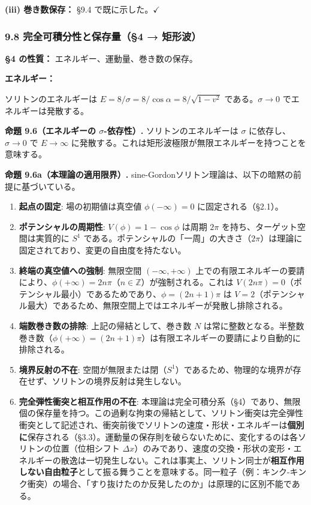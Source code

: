 \documentclass[a4paper,11pt]{ltjsarticle}
\providecommand{\tightlist}{\setlength{\itemsep}{0pt}\setlength{\parskip}{0pt}}
\begin{document}
\textbf{(iii) 巻き数保存：} §9.4 で既に示した。\(\checkmark\)

\subsubsection{9.8 完全可積分性と保存量（§4 →
矩形波）}\label{ux5b8cux5168ux53efux7a4dux5206ux6027ux3068ux4fddux5b58ux91cf4-ux77e9ux5f62ux6ce2}

\textbf{§4 の性質：} エネルギー、運動量、巻き数の保存。

\textbf{エネルギー：}

ソリトンのエネルギーは \(E = 8/\sigma = 8/\cos\alpha = 8/\sqrt{1-v^2}\)
である。\(\sigma \to 0\) でエネルギーは発散する。

\textbf{命題 9.6（エネルギーの \(\sigma\)-依存性）.}
ソリトンのエネルギーは \(\sigma\) に依存し、\(\sigma \to 0\) で
\(E \to \infty\)
に発散する。これは矩形波極限が無限エネルギーを持つことを意味する。

\textbf{命題 9.6a（本理論の適用限界）.}
sine-Gordonソリトン理論は、以下の暗黙の前提に基づいている。

\begin{enumerate}
\def\labelenumi{\arabic{enumi}.}
\tightlist
\item
  \textbf{起点の固定}: 場の初期値は真空値 \(\phi(-\infty) = 0\)
  に固定される（§2.1）。
\item
  \textbf{ポテンシャルの周期性}: \(V(\phi) = 1-\cos\phi\) は周期
  \(2\pi\) を持ち、ターゲット空間は実質的に \(S^1\)
  である。ポテンシャルの「一周」の大きさ（\(2\pi\)）は理論に固定されており、変更の自由度を持たない。
\item
  \textbf{終端の真空値への強制}: 無限空間 \((-\infty, +\infty)\)
  上での有限エネルギーの要請により、\(\phi(+\infty) = 2n\pi\)（\(n \in \mathbb{Z}\)）が強制される。これは
  \(V(2n\pi) = 0\)（ポテンシャル最小）であるためであり、\(\phi = (2n+1)\pi\)
  は
  \(V = 2\)（ポテンシャル最大）であるため、無限空間上ではエネルギーが発散し排除される。
\item
  \textbf{端数巻き数の排除}: 上記の帰結として、巻き数 \(N\)
  は常に整数となる。半整数巻き数（\(\phi(+\infty) = (2n+1)\pi\)）は有限エネルギーの要請により自動的に排除される。
\item
  \textbf{境界反射の不在}:
  空間が無限または閉（\(S^1\)）であるため、物理的な境界が存在せず、ソリトンの境界反射は発生しない。
\item
  \textbf{完全弾性衝突と相互作用の不在}:
  本理論は完全可積分系（§4）であり、無限個の保存量を持つ。この過剰な拘束の帰結として、ソリトン衝突は完全弾性衝突として記述され、衝突前後でソリトンの速度・形状・エネルギーは\textbf{個別に}保存される（§3.3）。運動量の保存則を破らないために、変化するのは各ソリトンの位置（位相シフト
  \(\Delta x\)）のみであり、速度の交換・形状の変形・エネルギーの散逸は一切発生しない。これは事実上、ソリトン同士が\textbf{相互作用しない自由粒子}として振る舞うことを意味する。同一粒子（例：キンク-キンク衝突）の場合、「すり抜けたのか反発したのか」は原理的に区別不能である。
\end{enumerate}
\end{document}
